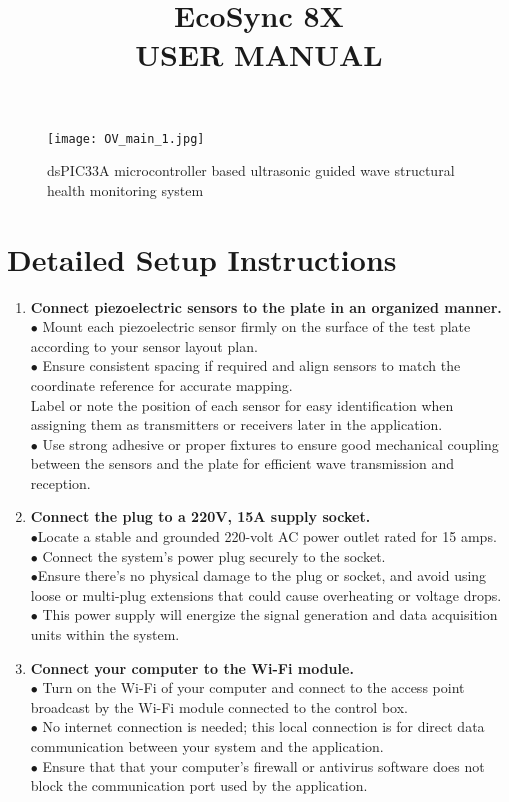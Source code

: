 \documentclass[12pt]{article}
\title{\textbf{{\Huge{EcoSync 8X}\\ \Large{USER MANUAL}}}}
\author{}
\date{}
\begin{document}
\maketitle
\begin{figure}[h]
    \centering
    \texttt{[image: OV\_main\_1.jpg]}
    \caption*{dsPIC33A microcontroller based ultrasonic guided wave structural health monitoring system}
\end{figure}
\section*{Detailed Setup Instructions}

\begin{enumerate}[label=\textbf{Step \arabic*:}, leftmargin=2.5em]

\item \textbf{Connect piezoelectric sensors to the plate in an organized manner.}
\\$\bullet$ Mount each piezoelectric sensor firmly on the surface of the test plate according to your sensor layout plan.\\ $\bullet$ Ensure consistent spacing if required and align sensors to match the coordinate reference for accurate mapping.\\ Label or note the position of each sensor for easy identification when assigning them as transmitters or receivers later in the application.\\$\bullet$ Use strong adhesive or proper fixtures to ensure good mechanical coupling between the sensors and the plate for efficient wave transmission and reception.

\item \textbf{Connect the plug to a 220V, 15A supply socket.} \\
$\bullet$Locate a stable and grounded 220-volt AC power outlet rated for 15 amps.\\$\bullet$ Connect the system's power plug securely to the socket.\\ $\bullet$Ensure there’s no physical damage to the plug or socket, and avoid using loose or multi-plug extensions that could cause overheating or voltage drops.\\$\bullet$ This power supply will energize the signal generation and data acquisition units within the system.

\item \textbf{Connect your computer to the Wi-Fi module.}\\$\bullet$ Turn on the Wi-Fi of your computer and connect to the access point broadcast by the Wi-Fi module connected to the control box.\\$\bullet$ No internet connection is needed; this local connection is for direct data communication between your system and the application.\\$\bullet$ Ensure that that your computer's firewall or antivirus software does not block the communication port used by the application.


\end{enumerate}
\end{document}
